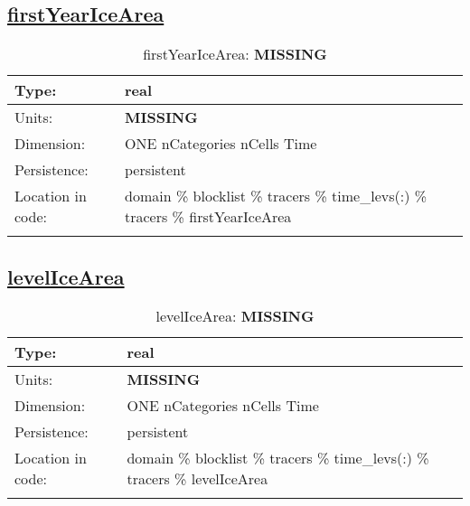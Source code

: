 \subsection[firstYearIceArea]{\hyperref[sec:var_tab_tracers]{firstYearIceArea}}
\label{subsec:var_sec_tracers_firstYearIceArea}
\begin{center}
\begin{longtable}{| p{2.0in} | p{4.0in} |}
        \hline 
        Type: & real \\
        \hline 
        Units: & {\bf \color{red} MISSING} \\
        \hline 
        Dimension: & ONE nCategories nCells Time \\
        \hline 
        Persistence: & persistent \\
        \hline 
         Location in code: & domain \% blocklist \% tracers \% time\_levs(:) \% tracers \% firstYearIceArea \\
         \hline 
    \caption{firstYearIceArea: {\bf \color{red} MISSING}}
\end{longtable}
\end{center}
\subsection[levelIceArea]{\hyperref[sec:var_tab_tracers]{levelIceArea}}
\label{subsec:var_sec_tracers_levelIceArea}
\begin{center}
\begin{longtable}{| p{2.0in} | p{4.0in} |}
        \hline 
        Type: & real \\
        \hline 
        Units: & {\bf \color{red} MISSING} \\
        \hline 
        Dimension: & ONE nCategories nCells Time \\
        \hline 
        Persistence: & persistent \\
        \hline 
         Location in code: & domain \% blocklist \% tracers \% time\_levs(:) \% tracers \% levelIceArea \\
         \hline 
    \caption{levelIceArea: {\bf \color{red} MISSING}}
\end{longtable}
\end{center}
